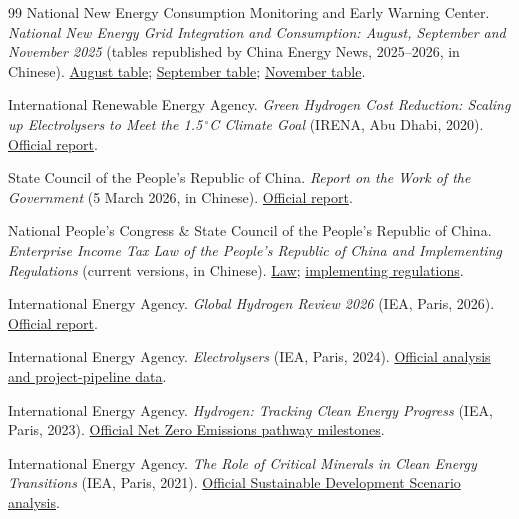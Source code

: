 \documentclass[pdflatex,sn-nature]{sn-jnl}
\begin{document}
\begin{thebibliography}{99}
National New Energy Consumption Monitoring and Early Warning Center. \emph{National New Energy Grid Integration and Consumption: August, September and November 2025} (tables republished by China Energy News, 2025--2026, in Chinese). \href{https://epaper.ceic.com/pc/attachment/202510/13/26e6af76-e1b7-40fb-b126-bc59f391e51c.pdf}{August table}; \href{https://epaper.ceic.com/pc/attachment/202511/07/6063762d-43ea-41fc-a37d-5f5549f62a5d.pdf}{September table}; \href{https://epaper.ceic.com/pc/attachment/202601/12/bf2a9f58-b724-435d-8c46-447e3ebbdc3d.pdf}{November table}.

International Renewable Energy Agency. \emph{Green Hydrogen Cost Reduction: Scaling up Electrolysers to Meet the 1.5\,$^\circ$C Climate Goal} (IRENA, Abu Dhabi, 2020). \href{https://www.irena.org/-/media/Files/IRENA/Agency/Publication/2020/Dec/IRENA_Green_hydrogen_cost_2020.pdf}{Official report}.

State Council of the People's Republic of China. \emph{Report on the Work of the Government} (5 March 2026, in Chinese). \href{https://www.npc.gov.cn/c2/c30834/202603/t20260316_453264.html}{Official report}.

National People's Congress \& State Council of the People's Republic of China. \emph{Enterprise Income Tax Law of the People's Republic of China and Implementing Regulations} (current versions, in Chinese). \href{https://flk.npc.gov.cn/detail?id=ff8080816f135f46016f2106acd11784}{Law}; \href{https://policy.mofcom.gov.cn/claw/clawContent.shtml?id=102338}{implementing regulations}.

International Energy Agency. \emph{Global Hydrogen Review 2026} (IEA, Paris, 2026). \href{https://www.iea.org/reports/global-hydrogen-review-2026}{Official report}.

International Energy Agency. \emph{Electrolysers} (IEA, Paris, 2024). \href{https://www.iea.org/energy-system/hydrogen/electrolysers}{Official analysis and project-pipeline data}.

International Energy Agency. \emph{Hydrogen: Tracking Clean Energy Progress} (IEA, Paris, 2023). \href{https://www.iea.org/reports/hydrogen-2156}{Official Net Zero Emissions pathway milestones}.

International Energy Agency. \emph{The Role of Critical Minerals in Clean Energy Transitions} (IEA, Paris, 2021). \href{https://www.iea.org/reports/the-role-of-critical-minerals-in-clean-energy-transitions/mineral-requirements-for-clean-energy-transitions}{Official Sustainable Development Scenario analysis}.


\end{thebibliography}
\end{document}
